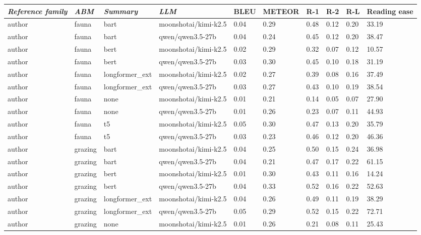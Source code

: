 \begin{tabular}{|l|l|l|l|l|l|l|l|l|l|}
\hline
\textit{\textbf{Reference family}} & \textit{\textbf{ABM}} & \textit{\textbf{Summary}} & \textit{\textbf{LLM}} & BLEU & METEOR & R-1 & R-2 & R-L & Reading ease \\
 \hline
 author & fauna & bart & moonshotai/kimi-k2.5 & 0.04 & 0.29 & 0.48 & 0.12 & 0.20 & 33.19 \\
 \hline
 author & fauna & bart & qwen/qwen3.5-27b & 0.04 & 0.24 & 0.45 & 0.12 & 0.20 & 38.47 \\
 \hline
 author & fauna & bert & moonshotai/kimi-k2.5 & 0.02 & 0.29 & 0.32 & 0.07 & 0.12 & 10.57 \\
 \hline
 author & fauna & bert & qwen/qwen3.5-27b & 0.03 & 0.30 & 0.45 & 0.10 & 0.18 & 31.19 \\
 \hline
 author & fauna & longformer\_ext & moonshotai/kimi-k2.5 & 0.02 & 0.27 & 0.39 & 0.08 & 0.16 & 37.49 \\
 \hline
 author & fauna & longformer\_ext & qwen/qwen3.5-27b & 0.03 & 0.27 & 0.43 & 0.10 & 0.19 & 38.54 \\
 \hline
 author & fauna & none & moonshotai/kimi-k2.5 & 0.01 & 0.21 & 0.14 & 0.05 & 0.07 & 27.90 \\
 \hline
 author & fauna & none & qwen/qwen3.5-27b & 0.01 & 0.26 & 0.23 & 0.07 & 0.11 & 44.93 \\
 \hline
 author & fauna & t5 & moonshotai/kimi-k2.5 & 0.05 & 0.30 & 0.47 & 0.13 & 0.20 & 35.79 \\
 \hline
 author & fauna & t5 & qwen/qwen3.5-27b & 0.03 & 0.23 & 0.46 & 0.12 & 0.20 & 46.36 \\
 \hline
 author & grazing & bart & moonshotai/kimi-k2.5 & 0.04 & 0.25 & 0.50 & 0.15 & 0.24 & 36.98 \\
 \hline
 author & grazing & bart & qwen/qwen3.5-27b & 0.04 & 0.21 & 0.47 & 0.17 & 0.22 & 61.15 \\
 \hline
 author & grazing & bert & moonshotai/kimi-k2.5 & 0.01 & 0.30 & 0.43 & 0.11 & 0.16 & 14.24 \\
 \hline
 author & grazing & bert & qwen/qwen3.5-27b & 0.04 & 0.33 & 0.52 & 0.16 & 0.22 & 52.63 \\
 \hline
 author & grazing & longformer\_ext & moonshotai/kimi-k2.5 & 0.04 & 0.26 & 0.49 & 0.11 & 0.19 & 38.29 \\
 \hline
 author & grazing & longformer\_ext & qwen/qwen3.5-27b & 0.05 & 0.29 & 0.52 & 0.15 & 0.22 & 72.71 \\
 \hline
 author & grazing & none & moonshotai/kimi-k2.5 & 0.01 & 0.26 & 0.21 & 0.08 & 0.11 & 25.43 \\

\end{tabular}
